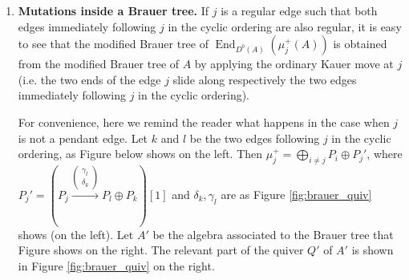 \documentclass[12pt]{amsart}
\theoremstyle{plain}
\theoremstyle{remark}
\theoremstyle{definition}
\newcommand{\End}{\mathop{\mathrm{End}}\nolimits}
\begin{document}
\begin{enumerate}
\item {\bf Mutations inside a Brauer tree.} If $j$ is a regular edge such that both edges immediately following $j$ in the cyclic ordering are also regular, it is easy to see that the modified Brauer tree of $\End_{D^b(A)}(\mu_j^+(A))$ is obtained from the modified Brauer tree of $A$ by applying the ordinary Kauer move at $j$ (i.e. the two ends of the edge $j$ slide along respectively the two edges immediately following $j$ in the cyclic ordering). 

For convenience, here we remind the reader what happens in the case when $j$ is not a pendant edge. Let $k$ and $l$ be the two edges following $j$ in the cyclic ordering, as Figure below shows on the left. Then $\mu_j^+ = \bigoplus_{i\neq j}P_i \oplus P_j'$, where $P_j' = (P_j \xrightarrow{\begin{pmatrix} \gamma_l \\ \delta_k \end{pmatrix} }P_l \oplus P_k)[1]$ and $\delta_k, \gamma_l$ are as Figure \ref{fig:brauer_quiv} shows (on the left). Let $A'$ be the algebra associated to the Brauer tree that Figure shows on the right. The relevant part of the quiver $Q'$ of $A'$ is shown in Figure \ref{fig:brauer_quiv}  on the right. 


\end{enumerate}
\end{document}
